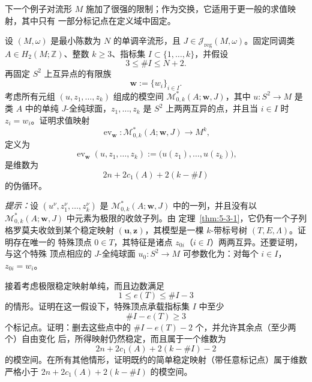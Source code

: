 下一个例子对流形 $M$ 施加了很强的限制；作为交换，它适用于更一般的求值映射，其中只有
一部分标记点在定义域中固定。

\begin{exercise}\label{ex:6-6-5}
设 $(M,\omega)$ 是最小陈数为 $N$ 的单调辛流形，且
$J\in\mathcal J_{\mathrm{reg}}(M,\omega)$。固定同调类
$A\in H_2(M;\mathbb Z)$、整数 $k\ge3$、指标集
$I\subset\{1,\ldots,k\}$，并假设
\[
  3\le\#I\le N+2.
\]
再固定 $S^2$ 上互异点的有限族
\[
  \mathbf w:=\{w_i\}_{i\in I}.
\]
考虑所有元组 $(u,z_1,\ldots,z_k)$ 组成的模空间
$\mathcal M^*_{0,k}(A;\mathbf w,J)$，其中 $u:S^2\to M$ 是类 $A$ 中的单纯
$J$-全纯球面，$z_1,\ldots,z_k$ 是 $S^2$ 上两两互异的点，并且当 $i\in I$ 时
$z_i=w_i$。证明求值映射
\[
  \operatorname{ev}_{\mathbf w}:
  \mathcal M^*_{0,k}(A;\mathbf w,J)\longrightarrow M^k,
\]
定义为
\[
  \operatorname{ev}_{\mathbf w}(u,z_1,\ldots,z_k)
  :=\bigl(u(z_1),\ldots,u(z_k)\bigr),
\]
是维数为
\[
  2n+2c_1(A)+2(k-\#I)
\]
的伪循环。

\emph{提示：}设
$(u^\nu,z_1^\nu,\ldots,z_k^\nu)$ 是
$\mathcal M^*_{0,k}(A;\mathbf w,J)$ 中的一列，并且没有以
$\mathcal M^*_{0,k}(A;\mathbf w,J)$ 中元素为极限的收敛子列。由
定理~\ref{thm:5-3-1}，它仍有一个子列格罗莫夫收敛到某个稳定映射
$(\mathbf u,\mathbf z)$，其模型是一棵 $k$-带标号树 $(T,E,\Lambda)$。证明存在唯一的
特殊顶点 $0\in T$，其特征是诸点 $z_{0i}$（$i\in I$）两两互异。还要证明，与这个特殊
顶点相应的 $J$-全纯球面 $u_0:S^2\to M$ 可参数化为：对每个 $i\in I$，
$z_{0i}=w_i$。

接着考虑极限稳定映射单纯，而且边数满足
\[
  1\le e(T)\le\#I-3
\]
的情形。证明在这一假设下，特殊顶点承载指标集 $I$ 中至少
\[
  \#I-e(T)\ge3
\]
个标记点。证明：删去这些点中的 $\#I-e(T)-2$ 个，并允许其余点（至少两个）自由变化
后，所得映射仍然稳定，而且属于一个维数为
\[
  2n+2c_1(A)+2(k-\#I)-2
\]
的模空间。在所有其他情形，证明既约的简单稳定映射（带任意标记点）属于维数严格小于
$2n+2c_1(A)+2(k-\#I)$ 的模空间。
\end{exercise}

